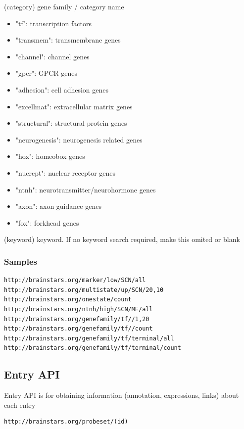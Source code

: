 \documentclass[12pt,fullpage]{article}
\begin{document}
\begin{description}
  \item{(category)} gene family / category name
    \begin{itemize}
      \item "tf": transcription factors
      \item "transmem": transmembrane genes
      \item "channel": channel genes
      \item "gpcr": GPCR genes
      \item "adhesion": cell adhesion genes
      \item "excellmat": extracellular matrix genes
      \item "structural": structural protein genes
      \item "neurogenesis": neurogenesis related genes
      \item "hox": homeobox genes
      \item "nucrcpt": nuclear receptor genes
      \item "ntnh": neurotransmitter/neurohormone genes
      \item "axon": axon guidance genes
      \item "fox": forkhead genes
  \end{itemize}
  \item{(keyword)} keyword. If no keyword search required, make this omited or blank  
\end{description}    

\subsubsection{Samples}
\begin{verbatim}
http://brainstars.org/marker/low/SCN/all
http://brainstars.org/multistate/up/SCN/20,10
http://brainstars.org/onestate/count
http://brainstars.org/ntnh/high/SCN/ME/all
http://brainstars.org/genefamily/tf//1,20
http://brainstars.org/genefamily/tf//count
http://brainstars.org/genefamily/tf/terminal/all
http://brainstars.org/genefamily/tf/terminal/count
\end{verbatim}

\subsection{Entry API}
Entry API is for obtaining information (annotation, expressions, links) about each entry
\begin{verbatim}
http://brainstars.org/probeset/(id)
\end{verbatim}
\end{document}

